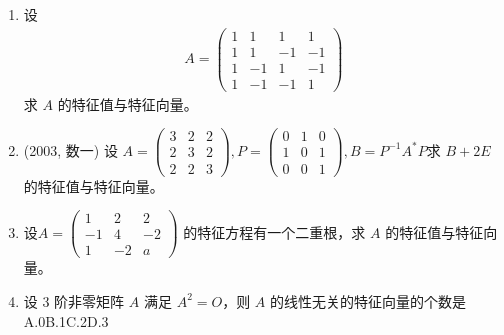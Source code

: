 \documentclass[12pt, a4paper, oneside, UTF8]{ctexbook}
\begin{document}
\begin{enumerate}
    \item 设
    \begin{align*}
    A = \begin{pmatrix}
    1 & 1 & 1 & 1 \\
    1 & 1 & -1 & -1\\
    1 & -1 & 1 & -1 \\
    1 & -1 & -1 & 1
    \end{pmatrix}
    \end{align*}
    求 $A$ 的特征值与特征向量。
    
    \begin{solution}
    \newpage
    \end{solution}
    
    \item (2003, 数一) 设
    $A = \begin{pmatrix}
    3 & 2 & 2 \\
    2 & 3 & 2 \\
    2 & 2 & 3
    \end{pmatrix},P=\begin{pmatrix}
        0 & 1 & 0 \\
        1 & 0 & 1 \\
        0 & 0 & 1 
    \end{pmatrix},B = P^{-1} A^* P$求 $B + 2E$ 的特征值与特征向量。
    
    \begin{solution}
    \newpage
    \end{solution}
    
    \item 设$
    A = \begin{pmatrix}
    1 & 2 & 2 \\
    -1 & 4 & -2 \\
    1 & -2 & a
    \end{pmatrix}$
    的特征方程有一个二重根，求 $A$ 的特征值与特征向量。
    
    \begin{solution}
    \newpage
    \end{solution}
    
    \item 设 3 阶非零矩阵 $A$ 满足 $A^2 = O$，则 $A$ 的线性无关的特征向量的个数是 \\
    A.0\qquad B.1\qquad C.2\qquad D.3
    
    \begin{solution}
    \newpage
    \end{solution}
    

\end{enumerate}
\end{document}
